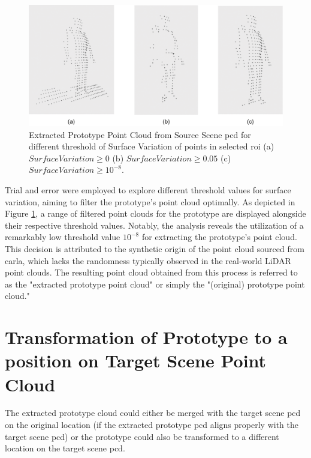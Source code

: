 \begin{figure}[htbp]
    \centering
    \includegraphics[width=0.8\linewidth]{97_graphics/results/prototype_extracted.pdf}
    \caption[Extracted Prototype Point Cloud from Source Scene \acrshort{pcd}.]{Extracted Prototype Point Cloud from Source Scene \acrshort{pcd} for different threshold of Surface Variation of points in selected \acrshort{roi} (a) \(Surface Variation \geq 0 \)  (b) \(Surface Variation \geq 0.05 \)  (c) \(Surface Variation \geq 10^{-8} \).}
    \label{fig:result-prototype_extracted}
\end{figure}

Trial and error were employed to explore different threshold values for surface variation, aiming to filter the prototype's point cloud optimally. As depicted in Figure \ref{fig:result-prototype_extracted}, a range of filtered point clouds for the prototype are displayed alongside their respective threshold values. Notably, the analysis reveals the utilization of a remarkably low threshold value \(10^{-8}\) for extracting the prototype's point cloud. This decision is attributed to the synthetic origin of the point cloud sourced from \acrshort{carla}, which lacks the randomness typically observed in the real-world LiDAR point clouds. The resulting point cloud obtained from this process is referred to as the "extracted prototype point cloud" or simply the "(original) prototype point cloud."

\section{Transformation of Prototype to a position on Target Scene Point Cloud}
The extracted prototype cloud could either be merged with the target scene \acrshort{pcd} on the original location (if the extracted prototype \acrshort{pcd} aligns properly with the target scene \acrshort{pcd}) or the prototype could also be transformed to a different location on the target scene \acrshort{pcd}.

